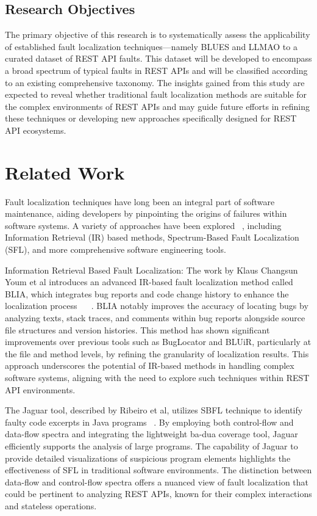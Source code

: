 \documentclass[conference]{IEEEtran}
\begin{document}
\subsection{Research Objectives}
The primary objective of this research is to systematically assess the applicability of established fault localization techniques—namely 
BLUES and LLMAO to a curated dataset of REST API faults. 
This dataset will be developed to encompass a broad spectrum of typical faults in REST APIs and will be classified according to an existing comprehensive taxonomy. 
The insights gained from this study are expected to reveal whether traditional fault localization methods are suitable for the complex environments of REST APIs and may guide future efforts in refining these techniques or developing new approaches specifically designed for REST API ecosystems.

\section{Related Work}
\label{sec:relatedwork}

Fault localization techniques have long been an integral part of software maintenance, aiding developers by pinpointing the origins of failures within software systems. 
A variety of approaches have been explored ~\cite{Wong2023_Software_Fault_localization}, including Information Retrieval (IR) based methods, Spectrum-Based Fault Localization (SFL), and more comprehensive software engineering tools.

Information Retrieval Based Fault Localization: The work by Klaus Changsun Youm et al introduces an advanced IR-based fault localization method called BLIA, which integrates bug reports and code change history to enhance the localization process  ~\cite{7467300} ~\cite{ctx114059874780001451}. BLIA notably improves the accuracy of locating bugs by analyzing texts, stack traces, and comments within bug reports alongside source file structures and version histories. This method has shown significant improvements over previous tools such as BugLocator and BLUiR, particularly at the file and method levels, by refining the granularity of localization results. This approach underscores the potential of IR-based methods in handling complex software systems, aligning with the need to explore such techniques within REST API environments.

The Jaguar tool, described by Ribeiro et al, utilizes SBFL technique to identify faulty code excerpts in Java programs ~\cite{8367068}. By employing both control-flow and data-flow spectra and integrating the lightweight ba-dua coverage tool, Jaguar efficiently supports the analysis of large programs. The capability of Jaguar to provide detailed visualizations of suspicious program elements highlights the effectiveness of SFL in traditional software environments. The distinction between data-flow and control-flow spectra offers a nuanced view of fault localization that could be pertinent to analyzing REST APIs, known for their complex interactions and stateless operations.
\end{document}

